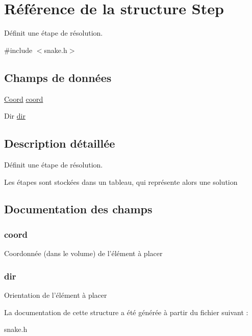 \hypertarget{struct_step}{\section{Référence de la structure Step}
\label{struct_step}
}


Définit une étape de résolution.  




{\ttfamily \#include $<$snake.\-h$>$}

\subsection*{Champs de données}
\begin{DoxyCompactItemize}
\item 
\hyperlink{struct_coord}{Coord} \hyperlink{struct_step_a825b51abf06a992115019d263c27dfc3}{coord}
\item 
Dir \hyperlink{struct_step_a4ca269cf93df1b512b52174c1a256fe5}{dir}
\end{DoxyCompactItemize}


\subsection{Description détaillée}
Définit une étape de résolution. 

Les étapes sont stockées dans un tableau, qui représente alors une solution 

\subsection{Documentation des champs}
\hypertarget{struct_step_a825b51abf06a992115019d263c27dfc3}{
\subsubsection[{coord}]{\setlength{\rightskip}{0pt plus 5cm}coord}}\label{struct_step_a825b51abf06a992115019d263c27dfc3}
Coordonnée (dans le volume) de l'élément à placer \hypertarget{struct_step_a4ca269cf93df1b512b52174c1a256fe5}{
\subsubsection[{dir}]{\setlength{\rightskip}{0pt plus 5cm}dir}}\label{struct_step_a4ca269cf93df1b512b52174c1a256fe5}
Orientation de l'élément à placer 

La documentation de cette structure a été générée à partir du fichier suivant \-:\begin{DoxyCompactItemize}
\item 
snake.\-h\end{DoxyCompactItemize}

